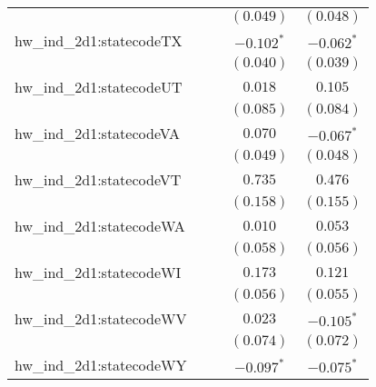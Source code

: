 \begin{center}
\begin{longtable}{l c c c c}
                         &                       &                       & $(0.049)$             & $(0.048)$             \\
hw\_ind\_2d1:statecodeTX &                       &                       & $\mathbf{-0.102}^{*}$ & $\mathbf{-0.062}^{*}$ \\
                         &                       &                       & $(0.040)$             & $(0.039)$             \\
hw\_ind\_2d1:statecodeUT &                       &                       & $0.018$               & $0.105$               \\
                         &                       &                       & $(0.085)$             & $(0.084)$             \\
hw\_ind\_2d1:statecodeVA &                       &                       & $0.070$               & $\mathbf{-0.067}^{*}$ \\
                         &                       &                       & $(0.049)$             & $(0.048)$             \\
hw\_ind\_2d1:statecodeVT &                       &                       & $0.735$               & $0.476$               \\
                         &                       &                       & $(0.158)$             & $(0.155)$             \\
hw\_ind\_2d1:statecodeWA &                       &                       & $0.010$               & $0.053$               \\
                         &                       &                       & $(0.058)$             & $(0.056)$             \\
hw\_ind\_2d1:statecodeWI &                       &                       & $0.173$               & $0.121$               \\
                         &                       &                       & $(0.056)$             & $(0.055)$             \\
hw\_ind\_2d1:statecodeWV &                       &                       & $0.023$               & $\mathbf{-0.105}^{*}$ \\
                         &                       &                       & $(0.074)$             & $(0.072)$             \\
hw\_ind\_2d1:statecodeWY &                       &                       & $\mathbf{-0.097}^{*}$ & $\mathbf{-0.075}^{*}$ \\

\end{longtable}
\end{center}
